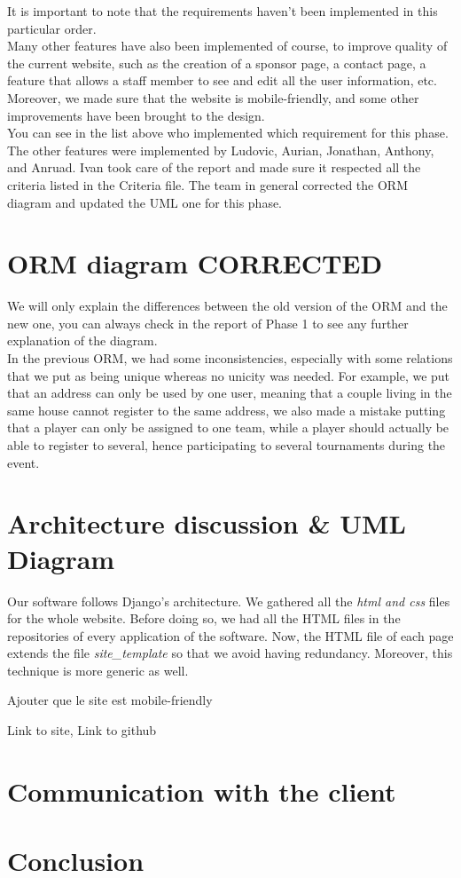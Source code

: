 \documentclass[a4paper, 12pt]{article}
\begin{document}
It is important to note that the requirements haven't been implemented in this particular order.\\

Many other features have also been implemented of course, to improve quality of the current website, such as the creation of a sponsor page, a contact page, a feature that allows a staff member to see and edit all the user information, etc. Moreover, we made sure that the website is mobile-friendly, and some other improvements have been brought to the design.\\

You can see in the list above who implemented which requirement for this phase. The other features were implemented by Ludovic, Aurian, Jonathan, Anthony, and Anruad. Ivan took care of the report and made sure it respected all the criteria listed in the Criteria file. The team in general corrected the ORM diagram and updated the UML one for this phase. \\

\section{ORM diagram CORRECTED}

We will only explain the differences between the old version of the ORM and the new one, you can always check in the report of Phase 1 to see any further explanation of the diagram. \\

In the previous ORM, we had some inconsistencies, especially with some relations that we put as being unique whereas no unicity was needed. For example, we put that an address can only be used by one user, meaning that a couple living in the same house cannot register to the same address, we also made a mistake putting that a player can only be assigned to one team, while a player should actually be able to register to several, hence participating to several tournaments during the event.
 

\section{Architecture discussion \& UML Diagram}

Our software follows Django's architecture. We gathered all the \textit{html and css} files for the whole website. Before doing so, we had all the HTML files in the repositories of every application of the software. Now, the HTML file of each page extends the file \textit{site\_template} so that we avoid having redundancy. Moreover, this technique is more generic as well. 



Ajouter que le site est mobile-friendly 


Link to site, Link to github

\section{Communication with the client}
\section{Conclusion}
\end{document}
